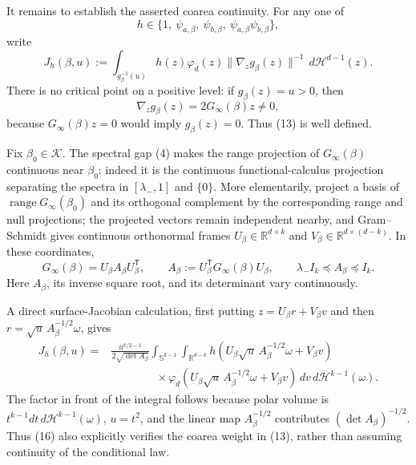 It remains to establish the asserted coarea continuity.  For any one of
\[
h\in\{1,\ \psi_{a,\beta},\ \psi_{b,\beta},\
\psi_{a,\beta}\psi_{b,\beta}\},
\tag{12}
\]
write
\[
J_h(\beta,u)
:=\int_{g_\beta^{-1}(u)}
h(z)\varphi_d(z)\lVert\nabla_zg_\beta(z)\rVert^{-1}
\,d\mathcal H^{d-1}(z).
\tag{13}
\]
There is no critical point on a positive level: if \(g_\beta(z)=u>0\), then
\[
\nabla_zg_\beta(z)=2G_\infty(\beta)z\neq0,
\tag{14}
\]
because \(G_\infty(\beta)z=0\) would imply \(g_\beta(z)=0\).  Thus (13) is well defined.

Fix \(\beta_0\in\mathcal K\).  The spectral gap (4) makes the range projection of \(G_\infty(\beta)\) continuous near \(\beta_0\): indeed it is the continuous functional-calculus projection separating the spectra in \([\lambda_-,1]\) and \(\{0\}\).  More elementarily, project a basis of \(\operatorname{range}G_\infty(\beta_0)\) and its orthogonal complement by the corresponding range and null projections; the projected vectors remain independent nearby, and Gram--Schmidt gives continuous orthonormal frames \(U_\beta\in\mathbb R^{d\times k}\) and \(V_\beta\in\mathbb R^{d\times(d-k)}\).  In these coordinates,
\[
G_\infty(\beta)
=U_\beta A_\beta U_\beta^{\mathsf T},
\qquad A_\beta:=U_\beta^{\mathsf T}G_\infty(\beta)U_\beta,
\qquad \lambda_-I_k\preceq A_\beta\preceq I_k.
\tag{15}
\]
Here \(A_\beta\), its inverse square root, and its determinant vary continuously.

A direct surface-Jacobian calculation, first putting
\(z=U_\beta r+V_\beta v\) and then
\(r=\sqrt u\,A_\beta^{-1/2}\omega\), gives
\[
\begin{split}
J_h(\beta,u)
={}&\frac{u^{k/2-1}}{2\sqrt{\det A_\beta}}
\int_{\mathbb S^{k-1}}\int_{\mathbb R^{d-k}}
h\!\left(U_\beta\sqrt u\,A_\beta^{-1/2}\omega+V_\beta v\right)\\
&\qquad\qquad\times
\varphi_d\!\left(U_\beta\sqrt u\,A_\beta^{-1/2}\omega+V_\beta v\right)
\,dv\,d\mathcal H^{k-1}(\omega).
\end{split}
\tag{16}
\]
The factor in front of the integral follows because polar volume is
\(t^{k-1}dt\,d\mathcal H^{k-1}(\omega)\), \(u=t^2\), and the linear map \(A_\beta^{-1/2}\) contributes \((\det A_\beta)^{-1/2}\).  Thus (16) also explicitly verifies the coarea weight in (13), rather than assuming continuity of the conditional law.

